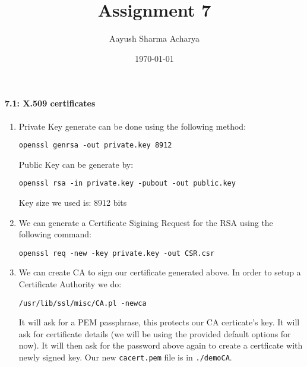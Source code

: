 \documentclass[a4paper]{article}
\title{Assignment 7}
\author{Aayush Sharma Acharya}
\date{\today}
\begin{document}
\maketitle

\paragraph*{7.1: X.509 certificates}

\begin{enumerate}[label=(\alph*)]
    \item Private Key generate can be done using the following method:
        \begin{verbatim}
openssl genrsa -out private.key 8912
        \end{verbatim}
        Public Key can be generate by:
        \begin{verbatim}
openssl rsa -in private.key -pubout -out public.key
        \end{verbatim}
        Key size we used is: 8912 bits

    \item We can generate a Certificate Sigining Request for the RSA using the following command:
        \begin{verbatim}
openssl req -new -key private.key -out CSR.csr
        \end{verbatim}

    \item We can create CA to sign our certificate generated above. In order to setup a Certificate Authority we do:
        \begin{verbatim}
/usr/lib/ssl/misc/CA.pl -newca
        \end{verbatim}
        It will ask for a PEM passphrase, this protects our CA certicate's key. It will ask for certificate details (we will be using the provided default options for now). It will then ask for the password above again to create a certficate with newly signed key. Our new \texttt{cacert.pem} file is in \texttt{./demoCA}.
\end{enumerate}
\end{document}
